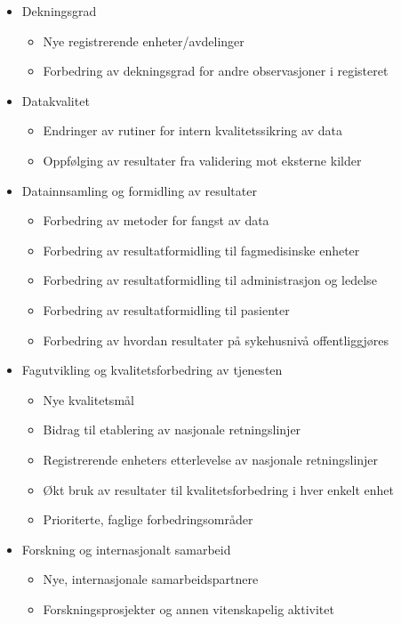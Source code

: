 \documentclass[norsk, a4paper, twocolumn]{report}
\begin{document}
\begin{itemize}
  \item Dekningsgrad
    \begin{itemize}
      \item Nye registrerende enheter/avdelinger
      \item Forbedring av dekningsgrad for andre observasjoner i registeret
    \end{itemize}
  \item Datakvalitet
    \begin{itemize}
      \item Endringer av rutiner for intern kvalitetssikring av data
      \item Oppfølging av resultater fra validering mot eksterne kilder
    \end{itemize}
  \item Datainnsamling og formidling av resultater
    \begin{itemize}
      \item Forbedring av metoder for fangst av data
      \item Forbedring av resultatformidling til fagmedisinske enheter
      \item Forbedring av resultatformidling til administrasjon og ledelse
      \item Forbedring av resultatformidling til pasienter
      \item Forbedring av hvordan resultater på sykehusnivå offentliggjøres
    \end{itemize}
  \item Fagutvikling og kvalitetsforbedring av tjenesten
    \begin{itemize}
      \item Nye kvalitetsmål
      \item Bidrag til etablering av nasjonale retningslinjer
      \item Registrerende enheters etterlevelse av nasjonale retningslinjer
      \item Økt bruk av resultater til kvalitetsforbedring i hver enkelt enhet
      \item Prioriterte, faglige forbedringsområder
    \end{itemize}
  \item Forskning og internasjonalt samarbeid
    \begin{itemize}
      \item Nye, internasjonale samarbeidspartnere
      \item Forskningsprosjekter og annen vitenskapelig aktivitet

\end{itemize}
\end{itemize}
\end{document}
